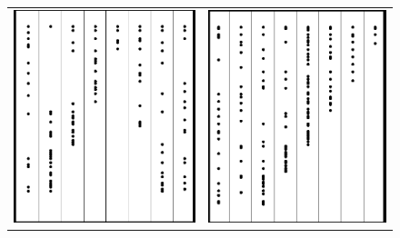 \documentclass[a4paper, 11pt]{article}
\begin{document}
\begin{figure}[H]
\begin{center}
\begin{tabular}{c c}
\includegraphics[scale=0.25]{Images/4By8MidTriOne.png} & \includegraphics[scale=0.25]{Images/3By8LeftOne.png}

\end{tabular}
\end{center}
\end{figure}
\end{document}
